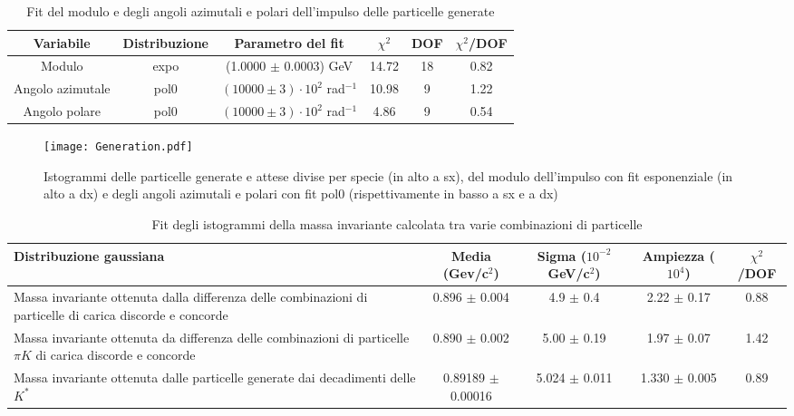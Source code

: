 \documentclass[a4paper,10pt]{article}
\begin{document}
\begin{table*}[p]
  \caption{Fit del modulo e degli angoli azimutali e polari dell'impulso delle particelle generate}
  \label{tab:fit}
  \centering
  \begin{tabular}{cccccc}
    \toprule
    Variabile        & Distribuzione & Parametro del fit                     & $\chi^2$ & DOF & $\chi^2$/DOF \\
    \midrule
    Modulo           & expo          & (1.0000 $\pm$ 0.0003) GeV             & 14.72    & 18  & 0.82         \\
    \midrule
    Angolo azimutale & pol0          & $(10000 \pm 3) \cdot 10^2$ rad$^{-1}$ & 10.98    & 9   & 1.22         \\
    Angolo polare    & pol0          & $(10000 \pm 3) \cdot 10^2$ rad$^{-1}$ & 4.86     & 9   & 0.54         \\
    \bottomrule
  \end{tabular}
\end{table*}

\begin{figure*}[p]
  \centering
  \texttt{[image: Generation.pdf]}
  \caption{Istogrammi delle particelle generate e attese divise per specie (in alto a sx), del modulo dell'impulso con fit esponenziale (in alto a dx) e degli angoli azimutali e polari con fit pol0 (rispettivamente in basso a sx e a dx)}
  \label{fig:Generation}
\end{figure*}

\begin{table*}
  \caption{Fit degli istogrammi della massa invariante calcolata tra varie combinazioni di particelle}
  \label{tab:fitgaus}
  \centering
  \begin{tabular}{p{4.5cm}cccc}
    \toprule
    Distribuzione gaussiana                                                                                        & Media (Gev/c$^2$)     & Sigma ($10^{-2}$ GeV/c$^2$) & Ampiezza ($10^4$) & $\chi^2$/DOF \\
    \midrule
    Massa invariante ottenuta dalla differenza delle combinazioni di particelle di carica discorde e concorde      & 0.896 $\pm$ 0.004     & 4.9 $\pm$ 0.4               & 2.22 $\pm$ 0.17   & 0.88         \\
    \midrule
    Massa invariante ottenuta da differenza delle combinazioni di particelle $\pi K$ di carica discorde e concorde & 0.890 $\pm$ 0.002     & 5.00 $\pm$ 0.19             & 1.97 $\pm$ 0.07   & 1.42         \\
    \midrule
    Massa invariante ottenuta dalle particelle generate dai decadimenti delle $K^*$                                & 0.89189 $\pm$ 0.00016 & 5.024 $\pm$ 0.011           & 1.330 $\pm$ 0.005 & 0.89         \\
    \bottomrule
  \end{tabular}
\end{table*}
\end{document}
